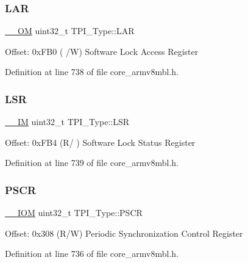 \subsubsection{\texorpdfstring{L\+AR}{LAR}}
{\footnotesize\ttfamily \hyperlink{core__sc300_8h_a0ea2009ed8fd9ef35b48708280fdb758}{\+\_\+\+\_\+\+OM} uint32\+\_\+t T\+P\+I\+\_\+\+Type\+::\+L\+AR}

Offset\+: 0x\+F\+B0 ( /W) Software Lock Access Register 

Definition at line 738 of file core\+\_\+armv8mbl.\+h.

\mbox{\label{struct_t_p_i___type_af5373794b1c024b28a2a59a9eab6498e}} 
\subsubsection{\texorpdfstring{L\+SR}{LSR}}
{\footnotesize\ttfamily \hyperlink{core__sc300_8h_a4cc1649793116d7c2d8afce7a4ffce43}{\+\_\+\+\_\+\+IM} uint32\+\_\+t T\+P\+I\+\_\+\+Type\+::\+L\+SR}

Offset\+: 0x\+F\+B4 (R/ ) Software Lock Status Register 

Definition at line 739 of file core\+\_\+armv8mbl.\+h.

\mbox{\label{struct_t_p_i___type_ad092e61fccb6752d3f4adbbd4a7e1567}} 
\subsubsection{\texorpdfstring{P\+S\+CR}{PSCR}}
{\footnotesize\ttfamily \hyperlink{core__sc300_8h_ab6caba5853a60a17e8e04499b52bf691}{\+\_\+\+\_\+\+I\+OM} uint32\+\_\+t T\+P\+I\+\_\+\+Type\+::\+P\+S\+CR}

Offset\+: 0x308 (R/W) Periodic Synchronization Control Register 

Definition at line 736 of file core\+\_\+armv8mbl.\+h.

\mbox{\label{struct_t_p_i___type_a409fb08ad6d58c17fcb7f59d65db6f93}} 
